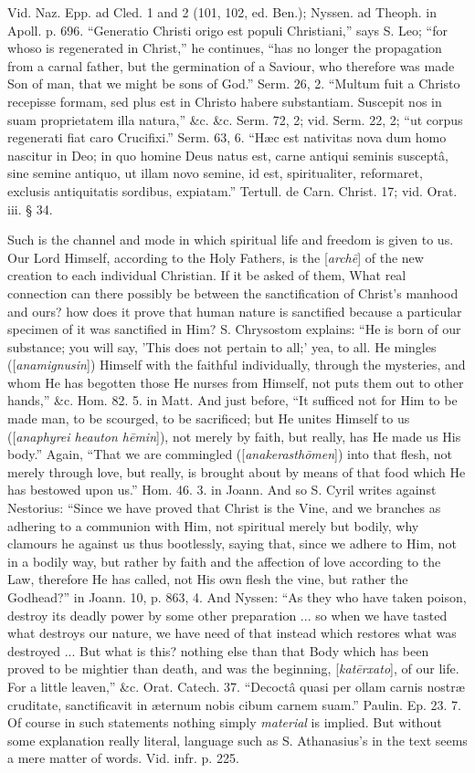 Vid. Naz. Epp. ad Cled. 1 and 2 (101, 102, ed.
Ben.); Nyssen. ad Theoph. in Apoll. p. 696. ``Generatio Christi origo
est populi Christiani,'' says S. Leo; ``for whoso is regenerated in
Christ,'' he continues, ``has no longer the propagation from a carnal
father, but the germination of a Saviour, who therefore was made Son
of man, that we might be sons of God.'' Serm. 26, 2. ``Multum fuit a
Christo recepisse formam, sed plus est in Christo habere substantiam.
Suscepit nos in suam proprietatem illa natura,'' \&c. \&c. Serm.
72, 2; vid. Serm. 22, 2; ``ut corpus regenerati fiat caro
Crucifixi.'' Serm. 63, 6. ``Hæc est nativitas nova dum homo nascitur in
Deo; in quo homine Deus natus est, carne antiqui seminis susceptâ,
sine semine antiquo, ut illam novo semine, id est, spiritualiter,
reformaret, exclusis antiquitatis sordibus, expiatam.'' Tertull. de
Carn. Christ. 17; vid. Orat. iii. § 34.

Such is the channel and mode in which spiritual
life and freedom is given to us. Our Lord Himself, according to
the Holy Fathers, is the [\emph{arch\={e}}] of the new creation to
each individual Christian. If it be asked of them, What real
connection can there possibly be between the sanctification of Christ's
manhood and ours? how does it prove that human nature is sanctified
because a particular specimen of it was sanctified in Him? S.
Chrysostom explains: ``He is born of our substance; you will say, 'This
does not pertain to all;' yea, to all. He mingles ([\emph{anamignusin}])
Himself with the faithful individually, through the mysteries, and
whom He has begotten those He nurses from Himself, not puts them out
to other hands,'' \&c. Hom. 82. 5. in Matt. And just before, ``It
sufficed not for Him to be made man, to be scourged, to be sacrificed;
but He unites Himself to us ([\emph{anaphyrei heauton h\={e}min}]),
not merely by faith, but really, has He made us His body.'' Again, ``That
we are commingled ([\emph{anakerasth\={o}men}]) into that flesh,
not merely through love, but really, is brought about by means of that
food which He has bestowed upon us.'' Hom. 46. 3. in Joann. And so S.
Cyril writes against Nestorius: ``Since we have proved that Christ is
the Vine, and we branches as adhering to a communion with Him, not
spiritual merely but bodily, why clamours he against us thus
bootlessly, saying that, since we adhere to Him, not in a bodily way,
but rather by faith and the affection of love according to the Law,
therefore He has called, not His own flesh the vine, but rather the
Godhead?'' in Joann. 10, p. 863, 4. And Nyssen: ``As they who have taken
poison, destroy its deadly power by some other preparation ... so when
we have tasted what destroys our nature, we have need of that
instead which restores what was destroyed ... But what is this?
nothing else than that Body which has been proved to be mightier than
death, and was the beginning, [\emph{kat\={e}rxato}], of our life.
For a little leaven,'' \&c. Orat. Catech. 37. ``Decoctâ quasi per
ollam carnis nostræ cruditate, sanctificavit in æternum nobis cibum
carnem suam.'' Paulin. Ep. 23. 7. Of course in such statements nothing
simply \emph{material} is implied.
But without some explanation really literal, language such as S.
Athanasius's in the text seems a mere matter of words. Vid. infr. p.
225.

